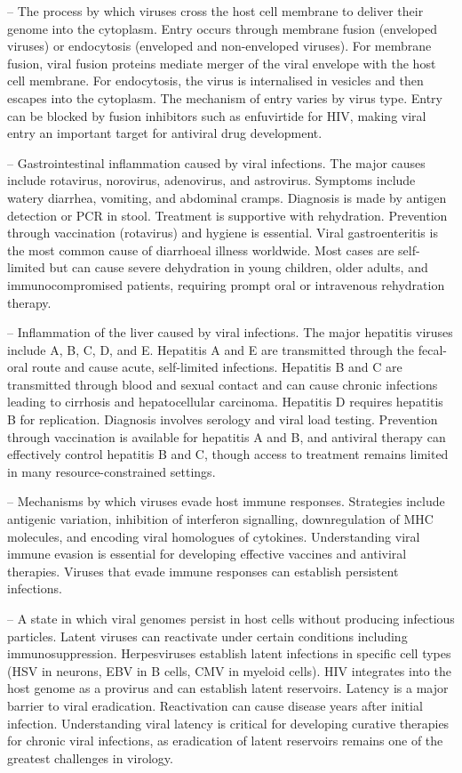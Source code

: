 -- The process by which viruses cross the host cell membrane to deliver their genome into the cytoplasm. Entry occurs through membrane fusion (enveloped viruses) or endocytosis (enveloped and non-enveloped viruses). For membrane fusion, viral fusion proteins mediate merger of the viral envelope with the host cell membrane. For endocytosis, the virus is internalised in vesicles and then escapes into the cytoplasm. The mechanism of entry varies by virus type. Entry can be blocked by fusion inhibitors such as enfuvirtide for HIV, making viral entry an important target for antiviral drug development.

-- Gastrointestinal inflammation caused by viral infections. The major causes include rotavirus, norovirus, adenovirus, and astrovirus. Symptoms include watery diarrhea, vomiting, and abdominal cramps. Diagnosis is made by antigen detection or PCR in stool. Treatment is supportive with rehydration. Prevention through vaccination (rotavirus) and hygiene is essential. Viral gastroenteritis is the most common cause of diarrhoeal illness worldwide. Most cases are self-limited but can cause severe dehydration in young children, older adults, and immunocompromised patients, requiring prompt oral or intravenous rehydration therapy.

-- Inflammation of the liver caused by viral infections. The major hepatitis viruses include A, B, C, D, and E. Hepatitis A and E are transmitted through the fecal-oral route and cause acute, self-limited infections. Hepatitis B and C are transmitted through blood and sexual contact and can cause chronic infections leading to cirrhosis and hepatocellular carcinoma. Hepatitis D requires hepatitis B for replication. Diagnosis involves serology and viral load testing. Prevention through vaccination is available for hepatitis A and B, and antiviral therapy can effectively control hepatitis B and C, though access to treatment remains limited in many resource-constrained settings.

-- Mechanisms by which viruses evade host immune responses. Strategies include antigenic variation, inhibition of interferon signalling, downregulation of MHC molecules, and encoding viral homologues of cytokines. Understanding viral immune evasion is essential for developing effective vaccines and antiviral therapies. Viruses that evade immune responses can establish persistent infections.

-- A state in which viral genomes persist in host cells without producing infectious particles. Latent viruses can reactivate under certain conditions including immunosuppression. Herpesviruses establish latent infections in specific cell types (HSV in neurons, EBV in B cells, CMV in myeloid cells). HIV integrates into the host genome as a provirus and can establish latent reservoirs. Latency is a major barrier to viral eradication. Reactivation can cause disease years after initial infection. Understanding viral latency is critical for developing curative therapies for chronic viral infections, as eradication of latent reservoirs remains one of the greatest challenges in virology.

